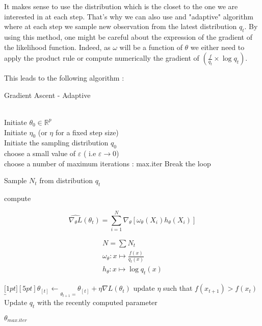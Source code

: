 It makes sense to use the distribution which is the closet to the one we are interested in at each step. That's why we can also use and "adaptive" algorithm where at each step we sample new observation from the latest distribution $q_t$. By using this method, one might be careful about the expression of the gradient of the likelihood function. Indeed, as $\omega$ will be a function of $\theta$ we either need to apply the product rule or compute numerically the gradient of $(\frac {f}{q_t} \times \log q_t)$.

This leads to the following algorithm :


\begin{algorithm}[H]
    \caption{Gradient Ascent - Adaptive}\label{alg:gaAdaptive}
    \begin{algorithmic}
        \Require 
        \\ \ra Initiate $\theta_0 \in \mathbb R^p$ 
        \\ \ra Initiate $\eta_0$ (or $\eta$ for a fixed step size) 
        \\ \ra Initiate the sampling distribution $q_0$
        \\ \ra choose a small value of $\varepsilon$ ( i.e $\varepsilon \rightarrow 0 $)
        \\ \ra choose a number of maximum iterations : max.iter
        \State Break the loop
        \EndIf

            \smallskip

            \State \ra Sample $N_t$ from distribution $q_t$ 
            
            \bigskip
            
            \State \ra compute 
            
            $$\widehat{\nabla_\theta L}(\theta_t) = \displaystyle\sum\limits_{i=1}^{N} \nabla_\theta \left[\omega_\theta(X_i) h_\theta(X_i)\right]$$ 
            

            $$\begin{array}{l}
                {N = \sum N_t}
                \\
                {\omega_\theta : x \mapsto \frac{f(x)}{q_t(x)}}
                \\
                {h_\theta : x \mapsto \log q_t(x)}
            \end{array}$$
            
            \bigskip

            \State \ra $\underbracket[1pt][5pt]{\theta_{[t]} \gets}_{\theta_{t+1} = } \theta_{[t]} + \eta \nabla L(\theta_t)$
            \State \ra update $\eta$ such that $f(x_{t+1}) > f(x_t)$ 
            \State \ra Update $q_t$ with the recently computed parameter
        \EndFor  
    
    \Return $\theta_{max.iter}$
    \end{algorithmic}
    \end{algorithm}

